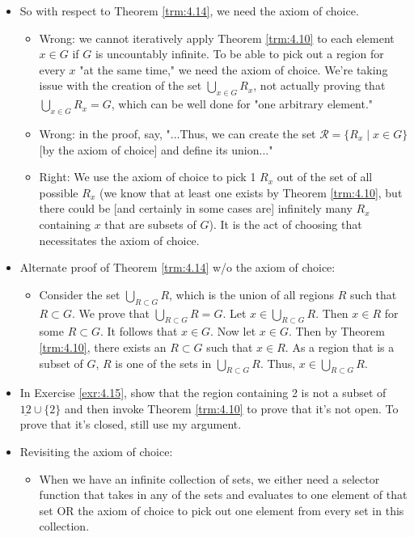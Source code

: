 \documentclass[titlepage]{report}
\begin{document}
\begin{itemize}
\begin{itemize}
    \end{itemize}
    \item So with respect to Theorem \ref{trm:4.14}, we need the axiom of choice.
    \begin{itemize}
        \item Wrong: we cannot iteratively apply Theorem \ref{trm:4.10} to each element $x\in G$ if $G$ is uncountably infinite. To be able to pick out a region for every $x$ "at the same time," we need the axiom of choice. We're taking issue with the creation of the set $\bigcup_{x\in G}R_x$, not actually proving that $\bigcup_{x\in G}R_x=G$, which can be well done for "one arbitrary element."
        \item Wrong: in the proof, say, "...Thus, we can create the set $\mathcal{R}=\{R_x\mid x\in G\}$ [by the axiom of choice] and define its union..."
        \item Right: We use the axiom of choice to pick 1 $R_x$ out of the set of all possible $R_x$ (we know that at least one exists by Theorem \ref{trm:4.10}, but there could be [and certainly in some cases are] infinitely many $R_x$ containing $x$ that are subsets of $G$). It is the act of choosing that necessitates the axiom of choice.
    \end{itemize}
    \item Alternate proof of Theorem \ref{trm:4.14} w/o the axiom of choice:
    \begin{itemize}
        \item Consider the set $\bigcup_{R\subset G}R$, which is the union of all regions $R$ such that $R\subset G$. We prove that $\bigcup_{R\subset G}R=G$. Let $x\in\bigcup_{R\subset G}R$. Then $x\in R$ for some $R\subset G$. It follows that $x\in G$. Now let $x\in G$. Then by Theorem \ref{trm:4.10}, there exists an $R\subset G$ such that $x\in R$. As a region that is a subset of $G$, $R$ is one of the sets in $\bigcup_{R\subset G}R$. Thus, $x\in\bigcup_{R\subset G}R$.
    \end{itemize}
    \item In Exercise \ref{exr:4.15}, show that the region containing 2 is not a subset of $\underline{12}\cup\{2\}$ and then invoke Theorem \ref{trm:4.10} to prove that it's not open. To prove that it's closed, still use my argument.
    \item {}Revisiting the axiom of choice:
    \begin{itemize}
        \item When we have an infinite collection of sets, we either need a selector function that takes in any of the sets and evaluates to one element of that set OR the axiom of choice to pick out one element from every set in this collection.

\end{itemize}
\end{itemize}
\end{document}
